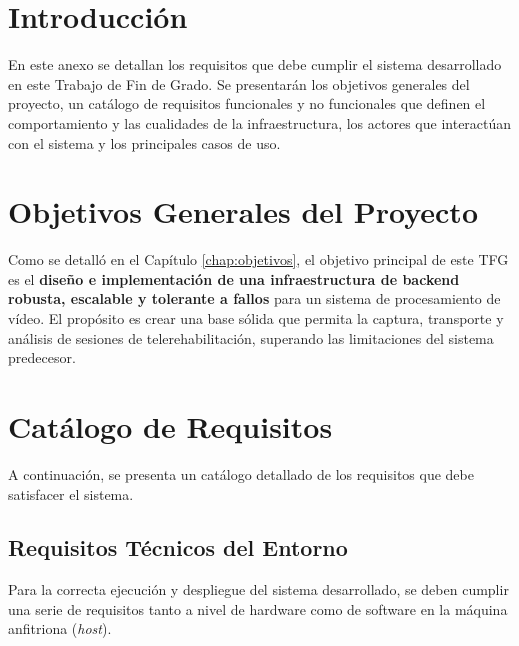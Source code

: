 \label{apendice:requisitos}

\section{Introducción}
En este anexo se detallan los requisitos que debe cumplir el sistema desarrollado en este Trabajo de Fin de Grado. Se presentarán los objetivos generales del proyecto, un catálogo de requisitos funcionales y no funcionales que definen el comportamiento y las cualidades de la infraestructura, los actores que interactúan con el sistema y los principales casos de uso.

\section{Objetivos Generales del Proyecto}
Como se detalló en el Capítulo \ref{chap:objetivos}, el objetivo principal de este TFG es el \textbf{diseño e implementación de una infraestructura de backend robusta, escalable y tolerante a fallos} para un sistema de procesamiento de vídeo. El propósito es crear una base sólida que permita la captura, transporte y análisis de sesiones de telerehabilitación, superando las limitaciones del sistema predecesor.

\section{Catálogo de Requisitos}
A continuación, se presenta un catálogo detallado de los requisitos que debe satisfacer el sistema.

\subsection{Requisitos Técnicos del Entorno}
Para la correcta ejecución y despliegue del sistema desarrollado, se deben cumplir una serie de requisitos tanto a nivel de hardware como de software en la máquina anfitriona (\textit{host}).


